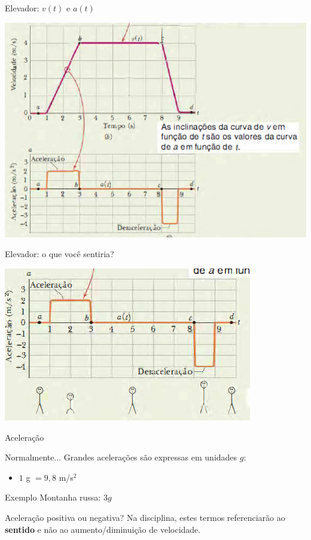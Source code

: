 \documentclass[xcolor=dvipsnames,table]{beamer}
\begin{document}
	\begin{frame}{Elevador: $v(t)$ e $a(t)$}
		\begin{center}
			\includegraphics[scale=0.6]{images/fig2-6bc}
		\end{center}
	\end{frame}

	\begin{frame}{Elevador: o que você sentiria?}
		\begin{center}
			\includegraphics[scale=0.6]{images/fig2-6d}
		\end{center}
	\end{frame}

	\begin{frame}{Aceleração}
		\begin{block}{Normalmente...}
			Grandes acelerações são expressas em unidades $g$:
			\begin{itemize}
				\item $1$ g $= 9,8$ m/s$^2$
			\end{itemize}
		\end{block} \pause
		\begin{block}{Exemplo}
			Montanha russa: $3g$
		\end{block}\pause
		\begin{block}{Aceleração positiva ou negativa?}
			Na disciplina, estes termos referenciarão ao {\bf sentido} e não ao aumento/diminuição de velocidade.
		\end{block}
	\end{frame}
\end{document}

